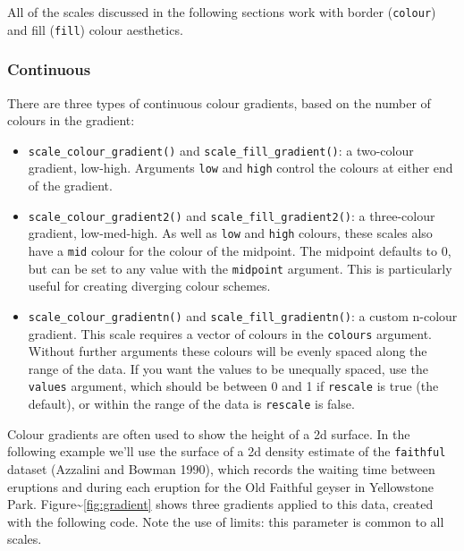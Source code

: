 All of the scales discussed in the following sections work with border
(\texttt{colour}) and fill (\texttt{fill}) colour aesthetics.

\subsubsection{Continuous}\label{ssub:colour-continuous}

There are three types of continuous colour gradients, based on the
number of colours in the gradient: 

\begin{itemize}
\itemsep1pt\parskip0pt
\item
  \texttt{scale\_colour\_gradient()} and
  \texttt{scale\_fill\_gradient()}: a two-colour gradient, low-high.
  Arguments \texttt{low} and \texttt{high} control the colours at either
  end of the gradient. 
\item
  \texttt{scale\_colour\_gradient2()} and
  \texttt{scale\_fill\_gradient2()}: a three-colour gradient,
  low-med-high. As well as \texttt{low} and \texttt{high} colours, these
  scales also have a \texttt{mid} colour for the colour of the midpoint.
  The midpoint defaults to 0, but can be set to any value with the
  \texttt{midpoint} argument. This is particularly useful for creating
  diverging colour schemes.
\item
  \texttt{scale\_colour\_gradientn()} and
  \texttt{scale\_fill\_gradientn()}: a custom n-colour gradient. This
  scale requires a vector of colours in the \texttt{colours} argument.
  Without further arguments these colours will be evenly spaced along
  the range of the data. If you want the values to be unequally spaced,
  use the \texttt{values} argument, which should be between 0 and 1 if
  \texttt{rescale} is true (the default), or within the range of the
  data is \texttt{rescale} is false.
\end{itemize}

Colour gradients are often used to show the height of a 2d surface. In
the following example we'll use the surface of a 2d density estimate of
the \texttt{faithful} dataset (Azzalini and Bowman 1990), which records
the waiting time between eruptions and during each eruption for the Old
Faithful geyser in Yellowstone Park.
Figure\textasciitilde{}\ref{fig:gradient} shows three gradients applied
to this data, created with the following code. Note the use of limits:
this parameter is common to all scales.

